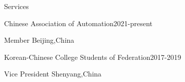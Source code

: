 \begin{rSection}{Services}

\begin{rSubsection}{Chinese Association of Automation}{2021-present}{}{}
  \item {Member} \hfill {Beijing,China}
\end{rSubsection}


\begin{rSubsection}{Korean-Chinese College Students of Federation}{2017-2019}{}{}
	\item {Vice President} \hfill {Shenyang,China}
\end{rSubsection}




\end{rSection}
